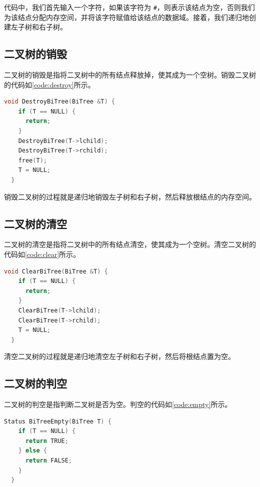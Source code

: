 \documentclass[lang=cn,newtx,10pt,scheme=chinese]{../elegantbook}
\begin{document}
代码中，我们首先输入一个字符，如果该字符为 \texttt{\#}，则表示该结点为空，否则我们为该结点分配内存空间，并将该字符赋值给该结点的数据域。接着，我们递归地创建左子树和右子树。

\subsection{二叉树的销毁}

二叉树的销毁是指将二叉树中的所有结点释放掉，使其成为一个空树。销毁二叉树的代码如\ref{code:destroy}所示。

\begin{lstlisting}[language=C++, caption={销毁二叉树}, label={code:destroy}]
  void DestroyBiTree(BiTree &T) {
    if (T == NULL) {
      return;
    }
    DestroyBiTree(T->lchild);
    DestroyBiTree(T->rchild);
    free(T);
    T = NULL;
  }
\end{lstlisting}

销毁二叉树的过程就是递归地销毁左子树和右子树，然后释放根结点的内存空间。

\subsection{二叉树的清空}

二叉树的清空是指将二叉树中的所有结点清空，使其成为一个空树。清空二叉树的代码如\ref{code:clear}所示。

\begin{lstlisting}[language=C++, caption={清空二叉树}, label={code:clear}]
  void ClearBiTree(BiTree &T) {
    if (T == NULL) {
      return;
    }
    ClearBiTree(T->lchild);
    ClearBiTree(T->rchild);
    T = NULL;
  }

\end{lstlisting}

清空二叉树的过程就是递归地清空左子树和右子树，然后将根结点置为空。

\subsection{二叉树的判空}

二叉树的判空是指判断二叉树是否为空。判空的代码如\ref{code:empty}所示。

\begin{lstlisting}[language=C++, caption={判空}, label={code:empty}]
  Status BiTreeEmpty(BiTree T) {
    if (T == NULL) {
      return TRUE;
    } else {
      return FALSE;
    }
  }

\end{lstlisting}
\end{document}
